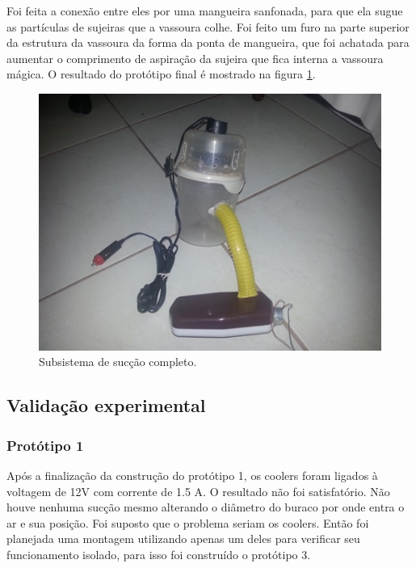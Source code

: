		Foi feita a conexão entre eles por uma mangueira sanfonada, para que ela sugue as partículas de sujeiras que a vassoura colhe. Foi feito um furo na parte superior da estrutura da vassoura da forma da ponta de mangueira, que foi achatada para aumentar o comprimento de aspiração da sujeira que fica interna a vassoura mágica. O resultado do protótipo final é mostrado na figura \ref{img:sistema_completo}.

		\begin{figure}[H]
			\centering
			\includegraphics[scale=1]{figuras/asppc2_13.jpg}
			\caption{Subsistema de sucção completo.}
			\label{img:sistema_completo}
		\end{figure}


\subsection{Validação experimental} %
	\label{sub:validação_experimental}

\subsubsection{Protótipo 1}
Após a finalização da construção do protótipo 1, os coolers foram ligados à voltagem de 12V com corrente de 1.5 A. O resultado não foi satisfatório. Não houve nenhuma sucção mesmo alterando o diâmetro do buraco por onde entra o ar e sua posição. Foi suposto que o problema seriam os coolers. Então foi planejada uma montagem utilizando apenas um deles para verificar seu funcionamento isolado, para isso foi construído o protótipo 3. 

